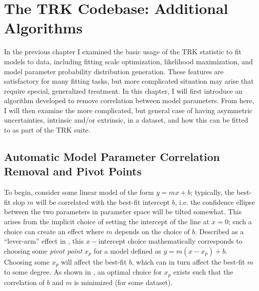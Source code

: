 \chapter{The TRK Codebase: Additional Algorithms}
\label{cha:code2}
In the previous chapter I examined the basic usage of the TRK statistic to fit models to data, including fitting scale optimization, likelihood maximization, and model parameter probability distribution generation. These features are satisfactory for many fitting tasks, but more complicated situation may arise that require special, generalized treatment. In this chapter, I will first introduce an algorithm developed to remove correlation between model parameters. From here, I will then examine the more complicated, but general case of having asymmetric uncertainties, intrinsic and/or extrinsic, in a dataset, and how this can be fitted to as part of the TRK suite.

\section{Automatic Model Parameter Correlation Removal and Pivot Points}
\label{sec:pivot}
To begin, consider some linear model of the form $y=mx+b$; typically, the best-fit slop $m$ will be correlated with the best-fit intercept $b$, i.e. the confidence ellipse between the two parameters in parameter space will be tilted somewhat. This arises from the implicit choice of setting the intercept of the line at $x=0$; such a choice can create an effect where $m$ depends on the choice of $b$. Described as a ``lever-arm'' effect in \textcite{trotter}, this $x-$intercept choice mathematically corresponds to choosing some \textit{pivot point} $x_p$ for a model defined as $y=m(x-x_p)+b$. Choosing some $x_p$ will affect the best-fit $b$, which can in turn affect the best-fit $m$ to some degree. As shown in \textcite{trotter}, an optimal choice for $x_p$ exists such that the correlation of $b$ and $m$ is minimized (for some dataset).


